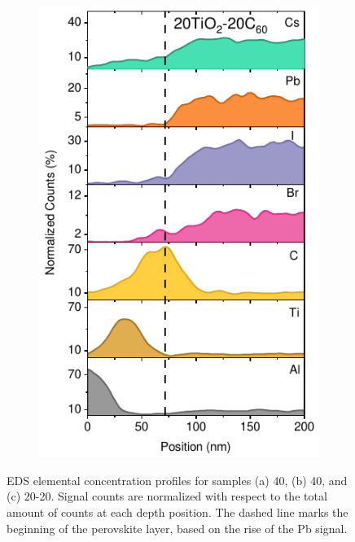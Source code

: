 \begin{figure}[htbp]
\begin{subfigure}{0.32\textwidth}
        \includegraphics[width=\textwidth]{chapters/transport_layers/images/TEM_20_20.pdf}
        \caption{}
        \label{}
    \end{subfigure}
    
    \caption{EDS elemental concentration profiles for samples (a) 40, (b) 40, and (c) 20-20. Signal counts are normalized with respect to the total amount of counts at each depth position. The dashed line marks the beginning of the perovskite layer, based on the rise of the Pb signal.}
    \label{fig:etl_opt:eds_concentration}
\end{figure}

